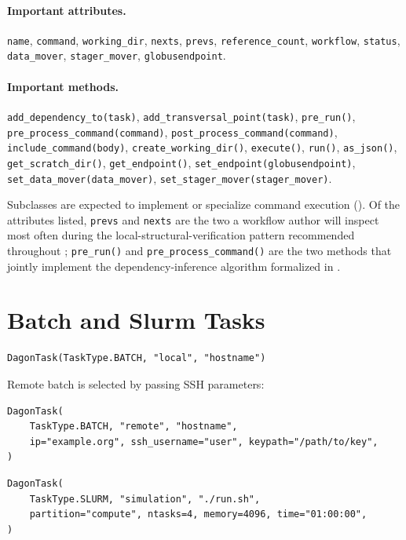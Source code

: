 \paragraph{Important attributes.} \texttt{name}, \texttt{command},
\texttt{working\_dir}, \texttt{nexts}, \texttt{prevs},
\texttt{reference\_count}, \texttt{workflow}, \texttt{status},
\texttt{data\_mover}, \texttt{stager\_mover}, \texttt{globusendpoint}.

\paragraph{Important methods.} \texttt{add\_dependency\_to(task)},
\texttt{add\_transversal\_point(task)}, \texttt{pre\_run()},
\texttt{pre\_process\_command(command)}, \texttt{post\_process\_command(command)},
\texttt{include\_command(body)}, \texttt{create\_working\_dir()},
\texttt{execute()}, \texttt{run()}, \texttt{as\_json()},
\texttt{get\_scratch\_dir()}, \texttt{get\_endpoint()},
\texttt{set\_endpoint(globusendpoint)}, \texttt{set\_data\_mover(data\_mover)},
\texttt{set\_stager\_mover(stager\_mover)}.

Subclasses are expected to implement or specialize command execution
(). Of the attributes listed, \texttt{prevs} and
\texttt{nexts} are the two a workflow author will inspect most often during
the local-structural-verification pattern recommended throughout
; \texttt{pre\_run()} and
\texttt{pre\_process\_command()} are the two methods that jointly implement
the dependency-inference algorithm formalized in .

\section{Batch and Slurm Tasks}

\begin{lstlisting}
DagonTask(TaskType.BATCH, "local", "hostname")
\end{lstlisting}

Remote batch is selected by passing SSH parameters:

\begin{lstlisting}
DagonTask(
    TaskType.BATCH, "remote", "hostname",
    ip="example.org", ssh_username="user", keypath="/path/to/key",
)
\end{lstlisting}

\begin{lstlisting}
DagonTask(
    TaskType.SLURM, "simulation", "./run.sh",
    partition="compute", ntasks=4, memory=4096, time="01:00:00",
)
\end{lstlisting}

